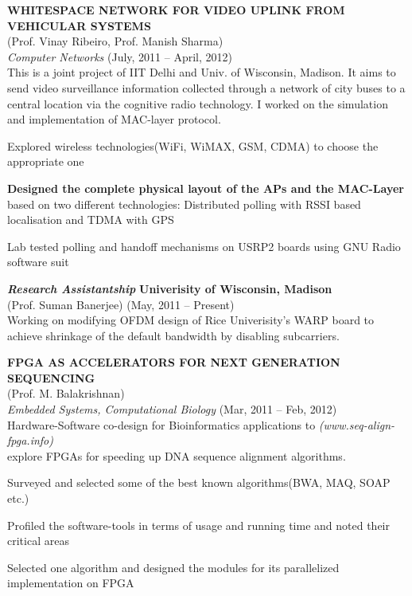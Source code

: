 \documentclass[margin,line]{resume}
\begin{document}
\begin{resume}
    \textbf{WHITESPACE NETWORK FOR VIDEO UPLINK FROM VEHICULAR SYSTEMS}    \vspace{1mm}\\\vspace{1mm}%
    (Prof. Vinay Ribeiro, Prof. Manish Sharma)					\\\vspace{1mm}%
    \textsl{Computer Networks}                                  		\hfill(July, 2011 -- April, 2012) \\%
    This is a joint project of IIT Delhi and Univ. of Wisconsin, Madison. It aims to send video surveillance information collected through a network of city buses to a central location via the cognitive radio technology. I worked on the simulation and implementation of MAC-layer protocol.
    \begin{list2}
        \item Explored wireless technologies(WiFi, WiMAX, GSM, CDMA) to choose the appropriate one
        \item \textbf{Designed the complete physical layout of the APs and the MAC-Layer} based on two different technologies: Distributed polling with RSSI based localisation and TDMA with GPS
	\item Lab tested polling and handoff mechanisms on USRP2 boards using GNU Radio software suit
     \end{list2}	
			      \vspace{-1mm}
    \textbf{\textsl{Research Assistantship}} 	 			\hfill\textbf{Univerisity of Wisconsin, Madison}\\%
    (Prof. Suman Banerjee)						\hfill(May, 2011 -- Present) \\
    Working on modifying OFDM design of Rice Univerisity's WARP board to achieve shrinkage of the default bandwidth by disabling subcarriers.

    
    \textbf{FPGA AS ACCELERATORS FOR NEXT GENERATION SEQUENCING}  		\vspace{1mm}\\\vspace{1mm}%
    (Prof. M. Balakrishnan)							\\\vspace{1mm}%
    \textsl{Embedded Systems, Computational Biology}   		                 \hfill(Mar, 2011 -- Feb, 2012) \\
    Hardware-Software co-design for Bioinformatics applications to              \hfill \textsl{(www.seq-align-fpga.info)} \\
    explore FPGAs for speeding up DNA sequence alignment algorithms.              
    \begin{list2}
        \item Surveyed and selected some of the best known algorithms(BWA, MAQ, SOAP etc.)
	\item Profiled the software-tools in terms of usage and running time and noted their critical areas 
	\item Selected one algorithm and designed the modules for its parallelized implementation on FPGA
    \end{list2}    	


\end{resume}
\end{document}
